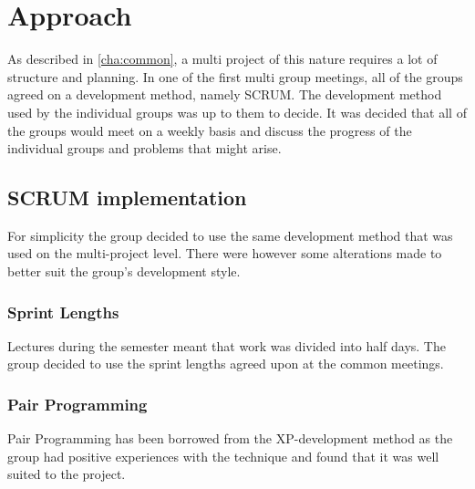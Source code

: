 \section{Approach}
As described in \autoref{cha:common}, a multi project of this nature requires a lot of structure and planning. In one of the first multi group meetings, all of the groups agreed on a development method, namely SCRUM. The development method used by the individual groups was up to them to decide. It was decided that all of the groups would meet on a weekly basis and discuss the progress of the individual groups and problems that might arise.  

\subsection{SCRUM implementation}
\label{sub:scrum_implementation}
For simplicity the group decided to use the same development method that was used on the multi-project level. There were however some alterations made to better suit the group's development style.

\subsubsection{Sprint Lengths}
Lectures during the semester meant that work was divided into half days. The group decided to use the sprint lengths agreed upon at the common meetings. 

\subsubsection{Pair Programming}
Pair Programming has been borrowed from the XP-development method as the group had positive experiences with the technique and found that it was well suited to the project. 
